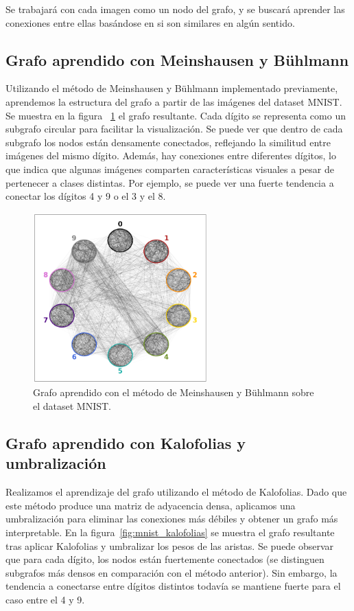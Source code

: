 \documentclass{article}
\begin{document}
Se trabajará con cada imagen como un nodo del grafo, y se buscará aprender las conexiones entre ellas basándose en si son similares en algún sentido.


\subsection{Grafo aprendido con Meinshausen y Bühlmann}

Utilizando el método de Meinshausen y Bühlmann implementado previamente, aprendemos la estructura del grafo a partir de las imágenes del dataset MNIST. Se muestra en la figura ~\ref{fig:mnist_meinshausen} el grafo resultante. Cada dígito se representa como un subgrafo circular para facilitar la visualización. Se puede ver que dentro de cada subgrafo los nodos están densamente conectados, reflejando la similitud entre imágenes del mismo dígito. Además, hay conexiones entre diferentes dígitos, lo que indica que algunas imágenes comparten características visuales a pesar de pertenecer a clases distintas. Por ejemplo, se puede ver una fuerte tendencia a conectar los dígitos 4 y 9 o el 3 y el 8. 
\begin{figure}[htb]
    \centering
    \includegraphics[width=0.6\textwidth]{imagenes/mnist/grafo_meinshausen_mnist.png}
    \caption{Grafo aprendido con el método de Meinshausen y Bühlmann sobre el dataset MNIST.}
    \label{fig:mnist_meinshausen}
\end{figure}

\subsection{Grafo aprendido con Kalofolias y umbralización}
Realizamos el aprendizaje del grafo utilizando el método de Kalofolias. Dado que este método produce una matriz de adyacencia densa, aplicamos una umbralización para eliminar las conexiones más débiles y obtener un grafo más interpretable. En la figura~\ref{fig:mnist_kalofolias} se muestra el grafo resultante tras aplicar Kalofolias y umbralizar los pesos de las aristas. Se puede observar que para cada dígito, los nodos están fuertemente conectados (se distinguen subgrafos más densos en comparación con el método anterior). Sin embargo, la tendencia a conectarse entre dígitos distintos todavía se mantiene fuerte para el caso entre el 4 y 9.  
\end{document}
